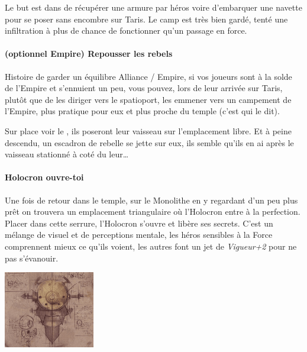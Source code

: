 Le but est dans de récupérer une armure par héros voire d’embarquer une navette pour se poser sans encombre sur Taris. Le camp est très bien gardé, tenté une infiltration à plus de chance de fonctionner qu’un passage en force.

\paragraph{(optionnel Empire) Repousser les rebels}
Histoire de garder un équilibre Alliance / Empire, si vos joueurs sont à la solde de l’Empire et s’ennuient un peu, vous pouvez, lors de leur arrivée sur Taris, plutôt que de les diriger vers le spatioport, les emmener vers un campement de l’Empire, plus pratique pour eux et plus proche du temple (c’est  qui le dit).

Sur place voir le , ils poseront leur vaisseau sur l’emplacement libre. Et à peine descendu, un escadron de rebelle se jette sur eux, ils semble qu’ils en ai après le vaisseau stationné à coté du leur\ldots

\paragraph{Holocron ouvre-toi}
Une fois de retour dans le temple, sur le Monolithe en y regardant d’un peu plus prêt on trouvera un emplacement triangulaire où l’Holocron entre à la perfection. Placer dans cette serrure, l’Holocron s’ouvre et libère ses secrets. C’est un mélange de visuel et de perceptions mentale, les héros sensibles à la Force comprennent mieux ce qu’ils voient, les autres font un jet de \textit{Vigueur+2} pour ne pas s’évanouir.

\noindent\includegraphics[width=\linewidth]{_img/talisman-book.png}

